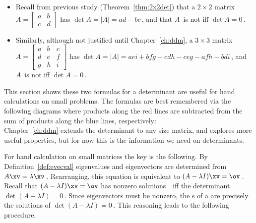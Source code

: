 \begin{itemize}
\item Recall from previous study (Theorem~\ref{thm:2x2det}) that a \(2\times 2\) matrix \(A=\begin{bmatrix} a&b\\c&d \end{bmatrix}\) has  \(\det A=|A|=ad-bc\)\,, and that \(A\)~is not  iff \(\det A=0\)\,.
\item Similarly, although not justified until Chapter~\ref{ch:ddm}, a \(3\times 3\) matrix \(A=\begin{bmatrix} a&b&c\\d&e&f\\g&h&i \end{bmatrix}\) has  \(\det A=|A|=aei+bfg+cdh-ceg-afh-bdi\)\,, and \(A\)~is not  iff \(\det A=0\)\,.
\end{itemize}
This section shows these two formulas for a determinant are useful for hand calculations on small problems.
The formulas are best remembered via the following diagrams where products along the red lines are subtracted from the sum of products along the blue lines, respectively:
\begin{equation}

\label{eq:dets23}
\end{equation}
Chapter~\ref{ch:ddm} extends the determinant to any size matrix, and explores more useful properties, but for now this is the information we need on determinants.


For hand calculation on small matrices the key is the following.
By Definition~\ref{def:evecval} eigenvalues and eigenvectors are determined from \(A\xv=\lambda\xv\)\,.  
Rearranging, this equation is equivalent to \((A-\lambda I)\xv=\ov\)\,.  
Recall that \((A-\lambda I)\xv=\ov\) has nonzero solutions~\xv\ iff the determinant \(\det(A-\lambda I)=0\)\,.
Since eigenvectors must be nonzero, the s of a  are precisely the solutions of \(\det(A-\lambda I)=0\)\,. 
This reasoning leads to the following procedure.


